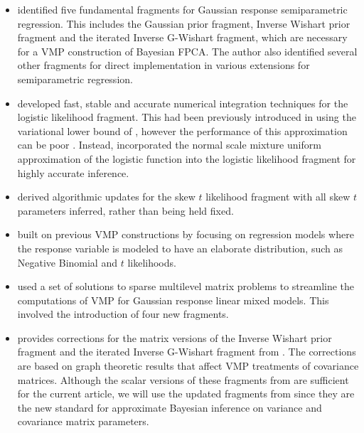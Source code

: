 \documentclass[12pt]{article}
\theoremstyle{plain}
\theoremstyle{definition}
\theoremstyle{remark}
\begin{document}
\begin{itemize}
	\item {} identified five fundamental fragments for Gaussian response semiparametric regression.
	This includes the Gaussian prior fragment, Inverse Wishart prior fragment and the iterated Inverse
	G-Wishart fragment, which are necessary for a VMP construction of Bayesian FPCA. The author also
	identified several other fragments for direct implementation in various extensions for semiparametric
	regression.
	\item {} developed fast, stable and accurate numerical integration techniques for 
	the logistic likelihood fragment. This had been previously introduced in  using the
	variational lower bound of , however the performance of this approximation can be poor
	\cite{knowles11}. Instead,  incorporated the normal scale mixture uniform approximation of
	the logistic function \cite{monahan92} into the logistic likelihood fragment for highly accurate inference.
	\item {} derived algorithmic updates for the skew $t$ likelihood fragment with all skew $t$
	parameters inferred, rather than being held fixed.
	\item {} built on previous VMP constructions by focusing on regression models where
	the response variable is modeled to have an elaborate distribution, such as Negative Binomial and
	$t$ likelihoods.
	\item {} used a set of solutions to sparse multilevel matrix problems \cite{nolan19} to
	streamline the computations of VMP for Gaussian response linear mixed models. This involved the
	introduction of four new fragments.
	\item {} provides corrections for the matrix versions of the Inverse Wishart prior fragment
	and the iterated Inverse G-Wishart fragment from . The corrections are based on graph
	theoretic results that affect VMP treatments of covariance matrices. Although the scalar versions of these
	fragments from  are sufficient for the current article, we will use the updated fragments
	from  since they are the new standard for approximate Bayesian inference on variance
	and covariance matrix parameters.
\end{itemize}

\end{document}
